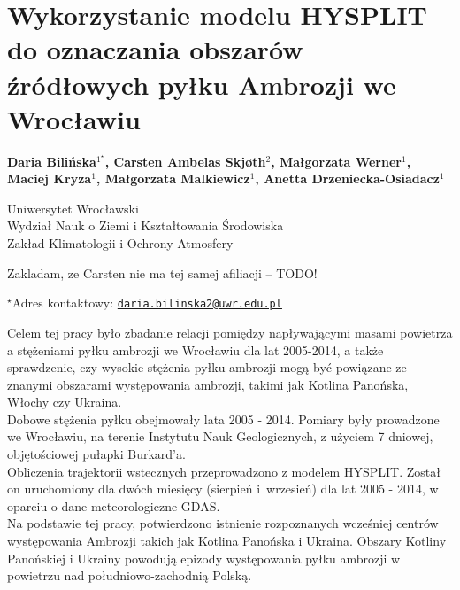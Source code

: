 \documentclass[\main/boa.tex]{subfiles}
\begin{document}
\section{Wykorzystanie modelu HYSPLIT do oznaczania obszarów źródłowych pyłku Ambrozji we Wrocławiu}

\begin{center}
  {\bf {} Daria Bilińska$^{1^\star}$,  Carsten Ambelas Skjøth$^{2}$,  Małgorzata Werner$^{1}$,  Maciej Kryza$^{1}$,  Małgorzata Malkiewicz$^{1}$,  Anetta Drzeniecka-Osiadacz$^{1}$}
\end{center}

\vskip 0.3cm

\begin{affiliations}
\begin{enumerate}
\begin{minipage}{0.915\textwidth}
\centering
\item Uniwersytet Wrocławski\\ Wydział Nauk o Ziemi i Kształtowania Środowiska\\Zakład Klimatologii i Ochrony Atmosfery\\[-2pt]
\item Zakladam, ze Carsten nie ma tej samej afiliacji -- TODO! \\[-2pt]
\end{minipage}
\end{enumerate}
$^\star$Adres kontaktowy: \href{mailto:daria.bilinska2@uwr.edu.pl}{\nolinkurl{daria.bilinska2@uwr.edu.pl}}\\
\end{affiliations}

\vskip 0.5cm


\vskip 0.5cm

Celem tej pracy było zbadanie relacji pomiędzy napływającymi masami powietrza a stężeniami pyłku ambrozji we Wrocławiu dla lat 2005-2014, a także sprawdzenie, czy wysokie stężenia pyłku ambrozji mogą być powiązane ze znanymi obszarami występowania ambrozji, takimi jak Kotlina Panońska, Włochy czy Ukraina.\\
Dobowe stężenia pyłku obejmowały lata 2005 - 2014. Pomiary były prowadzone we Wrocławiu, na terenie Instytutu Nauk Geologicznych, z użyciem 7 dniowej, objętościowej pułapki Burkard’a. \\
Obliczenia trajektorii wstecznych przeprowadzono z modelem HYSPLIT. Został on uruchomiony dla dwóch miesięcy (sierpień i wrzesień) dla lat 2005 - 2014, w oparciu o dane meteorologiczne GDAS.\\
Na podstawie tej pracy, potwierdzono istnienie rozpoznanych wcześniej centrów występowania Ambrozji takich jak Kotlina Panońska i Ukraina. Obszary Kotliny Panońskiej i Ukrainy powodują epizody występowania pyłku ambrozji w powietrzu nad południowo-zachodnią Polską.
\end{document}
